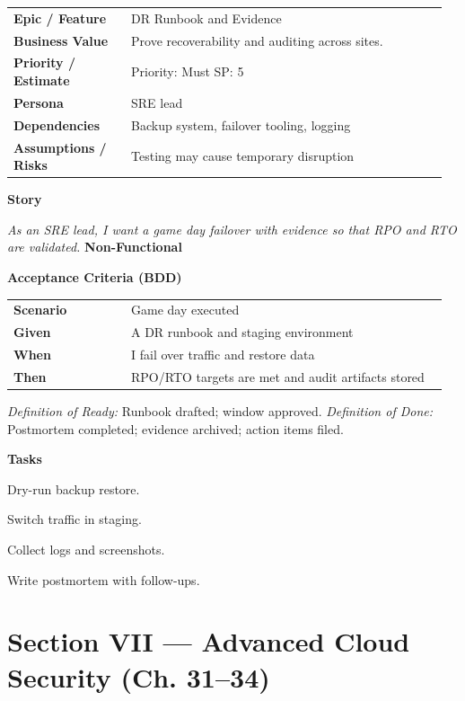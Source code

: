 \documentclass[11pt,letterpaper]{article}
\makeatletter
\newenvironment{kvtable}{%
  \begin{tabular}{@{}>{\bfseries\arraybackslash}p{0.26\linewidth} p{0.70\linewidth}@{}}
}{\end{tabular}}
\newenvironment{bdd}{%
  \begin{tabular}{@{}>{\bfseries\arraybackslash}p{0.26\linewidth} p{0.70\linewidth}@{}}
}{\end{tabular}}
\newcommand{\DoRDoD}[2]{%
  \vspace{0.35em}
  {\footnotesize\color{Muted}%
    \textit{Definition of Ready:} #1 \; \textbullet\;
    \textit{Definition of Done:} #2%
  }%
}
\newenvironment{storycard}[2]{%
  \begin{tcolorbox}[cloudcard, title={#1 --- #2}]%
}{\end{tcolorbox}}
\newcommand{\sectionlabel}[1]{\vspace{0.35em}\textbf{#1}\par}
\makeatother
\begin{document}
\begin{storycard}{CCS-30}{Ch. 30 — Availability, Recovery, \& Auditing}
\begin{kvtable}
Epic / Feature & DR Runbook and Evidence\\
Business Value & Prove recoverability and auditing across sites.\\
Priority / Estimate & Priority: Must \quad SP: 5\\
Persona & SRE lead\\
Dependencies & Backup system, failover tooling, logging\\
Assumptions / Risks & Testing may cause temporary disruption\\
\end{kvtable}
\sectionlabel{Story}
\textit{As an SRE lead, I want a game day failover with evidence so that RPO and RTO are validated.}
\sectionlabel{Non-Functional}\;
\sectionlabel{Acceptance Criteria (BDD)}
\begin{bdd}
Scenario & Game day executed\\
Given & A DR runbook and staging environment\\
When & I fail over traffic and restore data\\
Then & RPO/RTO targets are met and audit artifacts stored\\
\end{bdd}
\DoRDoD{Runbook drafted; window approved.}{Postmortem completed; evidence archived; action items filed.}
\sectionlabel{Tasks}
\begin{checklist}
\item Dry-run backup restore.
\item Switch traffic in staging.
\item Collect logs and screenshots.
\item Write postmortem with follow-ups.
\end{checklist}
\end{storycard}

\section{Section VII — Advanced Cloud Security (Ch. 31--34)}
\end{document}
